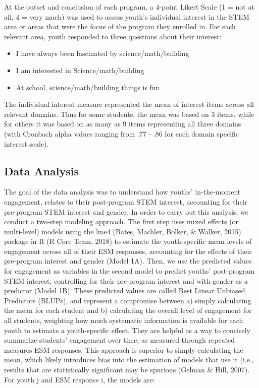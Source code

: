 \documentclass[man]{apa6}
\providecommand{\tightlist}{%
  \setlength{\itemsep}{0pt}\setlength{\parskip}{0pt}}
\theoremstyle{definition}
\theoremstyle{definition}
\theoremstyle{definition}
\theoremstyle{remark}
\begin{document}
At the outset and conclusion of each program, a 4-point Likert Scale (1
= not at all, 4 = very much) was used to assess youth's individual
interest in the STEM area or areas that were the focus of the program
they enrolled in. For each relevant area, youth responded to three
questions about their interest:

\begin{itemize}
\tightlist
\item
  I have always been fascinated by science/math/building
\item
  I am interested in Science/math/building
\item
  At school, science/math/building things is fun
\end{itemize}

The individual interest measure represented the mean of interest items
across all relevant domains. Thus for some students, the mean was based
on 3 items, while for others it was based on as many as 9 items
representing all three domains (with Cronbach alpha values ranging from
.77 - .86 for each domain specific interest scale).

\subsection{Data Analysis}\label{data-analysis}

The goal of the data analysis was to understand how youths'
in-the-moment engagement, relates to their post-program STEM interest,
accounting for their pre-program STEM interest and gender. In order to
carry out this analysis, we conduct a two-step modeling approach. The
first step uses mixed effects (or multi-level) models using the lme4
(Bates, Machler, Bolker, \& Walker, 2015) package in R (R Core Team,
2018) to estimate the youth-specific mean levels of engagement across
all of their ESM responses, accounting for the effects of their
pre-program interest and gender (Model 1A). Then, we use the predicted
values for engagement as variables in the second model to predict
youths' post-program STEM interest, controlling for their pre-program
interest and with gender as a predictor (Model 1B). These predicted
values are called Best Linear Unbiased Predictors (BLUPs), and represent
a compromise between a) simply calculating the mean for each student and
b) calculating the overall level of engagement for all students,
weighting how much systematic information is available for each youth to
estimate a youth-specific effect. They are helpful as a way to concisely
summarize students' engagement over time, as measured through repeated
measures ESM responses. This approach is superior to simply calculating
the mean, which likely introduces bias into the estimation of models
that use it (i.e., results that are statistically significant may be
spurious (Gelman \& Hill, 2007). For youth j and ESM response i, the
models are:
\end{document}
